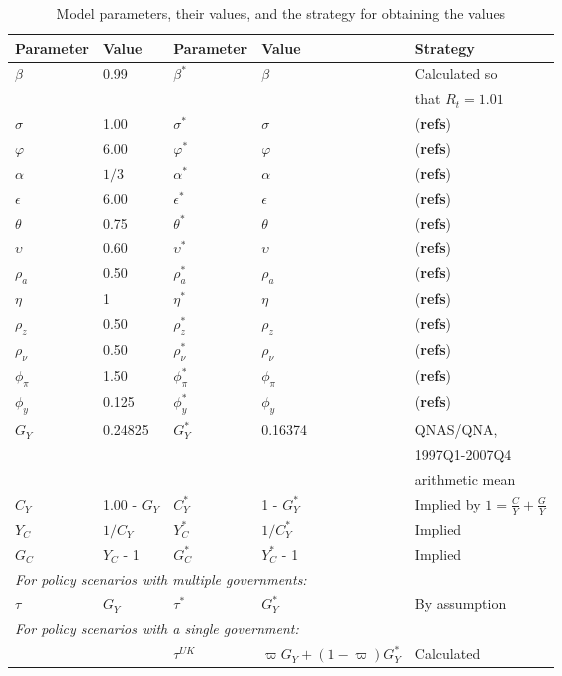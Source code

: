 \begin{table}[H] \label{table:model_parameters}
    \centering
    \begin{tabular}{ll|lll}
        Parameter & Value & Parameter & Value & Strategy \\
        \hline
        \hline
        $\beta$ & 0.99 & $\beta^*$ & $\beta$ & Calculated so \\ 
        & & & &that $R_t = 1.01$\\
        $\sigma$ & 1.00 & $\sigma^*$ & $\sigma$ & (\textbf{refs})\\
        $\varphi$ & 6.00 & $\varphi^*$ & $\varphi$ & (\textbf{refs})\\
        $\alpha$ & $1/3$ & $\alpha^*$ & $\alpha$ & (\textbf{refs})\\
        $\epsilon$ & 6.00 & $\epsilon^*$ & $\epsilon$ & (\textbf{refs})\\
        $\theta$ & 0.75 & $\theta^*$ & $\theta$ & (\textbf{refs})\\
        $\upsilon$ & 0.60 & $\upsilon^*$ & $\upsilon$ & (\textbf{refs})\\
        $\rho_a$ & 0.50 & $\rho_a^*$ & $\rho_a$ & (\textbf{refs})\\
        $\eta$ & 1 & $\eta^*$ & $\eta$ & (\textbf{refs})\\
        $\rho_z$ & 0.50 & $\rho_z^*$ & $\rho_z$ & (\textbf{refs})\\
        $\rho_\nu$ & 0.50 & $\rho^*_\nu$ & $\rho_\nu$ & (\textbf{refs})\\
        $\phi_\pi$ & 1.50 & $\phi^*_\pi$ & $\phi_\pi$ & (\textbf{refs})\\
        $\phi_y$ & 0.125 & $\phi^*_y$ & $\phi_y$ & (\textbf{refs})\\
        $G_Y$ & 0.24825 & $G_Y^*$ & 0.16374 & QNAS/QNA, \\ & & & &1997Q1-2007Q4\\ &&&& arithmetic mean\\
        $C_Y$ & 1.00 - $G_Y$ & $C_Y^*$ & 1 - $G_Y^*$ & Implied by $1=\frac{C}{Y} + \frac{G}{Y}$\\
        $Y_C$ & $1/{C_Y}$ & $Y_C^*$ & $1/{C_Y^*}$ & Implied \\
        $G_C$ & $Y_C$ - 1 & $G_C^*$ & $Y_C^*$ - 1 & Implied \\
        \multicolumn{5}{l}{\textit{For policy scenarios with multiple governments:}} \\
        $\tau$ & $G_Y$ & $\tau^*$ & $G_Y^*$ & By assumption\\
        \multicolumn{5}{l}{\textit{For policy scenarios with a single government:}} \\
         &&$\tau^{UK}$    & $\varpi G_Y + (1-\varpi)G^*_Y$  & Calculated\\
    \end{tabular}
    \caption{Model parameters, their values, and the strategy for obtaining the values}
\end{table}